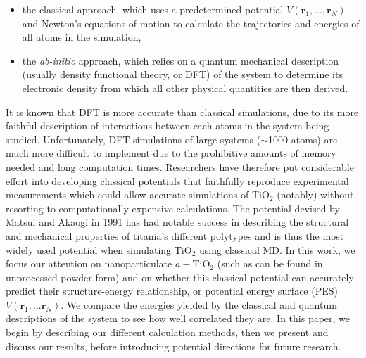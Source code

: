 \documentclass[aps,prb,twocolumn,amsmath,amssymb,superscriptaddress,longbibliography]{revtex4-1}
\begin{document}
\begin{itemize}
\item the classical approach, which uses a predetermined potential ${V(\textbf{r}_1,...,\textbf{r}_N)}$ and Newton's equations of motion to calculate the trajectories and energies of all atoms in the simulation,
\item the \textit{ab-initio} approach, which relies on a quantum mechanical description (usually density functional theory, or DFT) of the system to determine its electronic density from which all other physical quantities are then derived.
\end{itemize}

It is known that DFT is more accurate than classical simulations, due to its more faithful description of interactions between each atoms in the system being studied.
Unfortunately, DFT simulations of large systems ($\sim$1000 atoms) are much more difficult to implement due to the prohibitive amounts of memory needed and long computation times.
Researchers have therefore put considerable effort into developing classical potentials that faithfully reproduce experimental measurements which could allow accurate simulations of $\text{TiO}_2$ (notably) without resorting to computationally expensive calculations\cite{kim,MA_og,opt_FF}.
The potential devised by Matsui and Akaogi in 1991\cite{MA_og} has had notable success in describing the structural and mechanical properties of titania's different polytypes\cite{smith_collins,vvh1} and is thus the most widely used potential when simulating $\text{TiO}_2$ using classical MD. 
In this work, we focus our attention on nanoparticulate $a-\text{TiO}_2$ (such as can be found in unprocessed powder form) and on whether this classical potential can accurately predict their structure-energy relationship, or potential energy surface (PES) ${V(\textbf{r}_1,...\textbf{r}_N)}$.
We compare the energies yielded by the classical and quantum descriptions of the system to see how well correlated they are.
In this paper, we begin by describing our different calculation methods, then we present and discuss our results, before introducing potential directions for future research.


\end{document}
